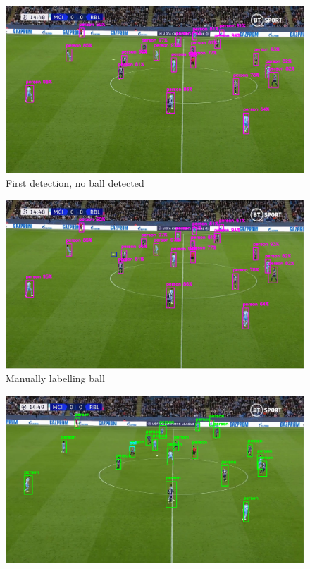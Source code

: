 \documentclass[
    11pt,
    oneside
]{report}
\begin{document}
\begin{appendices}
\begin{figure}[H]
    \includegraphics[keepaspectratio, width=\columnwidth]{first.png}
    \caption{First detection, no ball detected}
    \label{img:1}
\end{figure}
\begin{figure}[H]
    \includegraphics[keepaspectratio, width=\columnwidth]{Screenshot_2022-03-03_21-32-51.png}
    \caption{Manually labelling ball}
    \label{img:2}
\end{figure}
\begin{figure}[H]
    \includegraphics[keepaspectratio, width=\columnwidth]{Screenshot_2022-03-03_21-35-39.png}

\end{figure}
\end{appendices}
\end{document}

